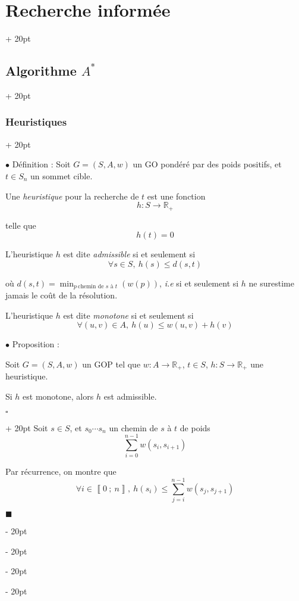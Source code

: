 \documentclass[a4paper, 12pt, twoside]{article}
\newcommand{\R}{\mathbb{R}} %
\newcommand{\nset}[2]{\left\llbracket #1\ ;\ #2 \right\rrbracket}
\renewcommand{\le}{\leqslant}
\newcommand{\ind}[1][20pt]{\advance\leftskip + #1}
\newcommand{\deind}[1][20pt]{\advance\leftskip - #1}
\newenvironment{indt}[2][20pt]{#2 \par \ind[#1]}{\par \deind} %
\newenvironment{proof}[1][{}]{\begin{indt}{$\square$ #1}}{$\blacksquare$ \end{indt}}
\begin{document}
\begin{indt}{\section{Recherche informée}}
\begin{indt}{\subsection{Algorithme $A^*$}}
\begin{indt}{\subsubsection{Heuristiques}}
                \vspace{12pt}
                
                $\bullet$ Définition : Soit $G = (S, A, w)$ un GO pondéré par des poids positifs, et $t \in S_n$ un sommet cible.

                Une \emph{heuristique} pour la recherche de $t$ est une fonction
                \[
                    h : S \longrightarrow \R_+
                \]

                telle que
                \[
                    h(t) = 0
                \]

                L'heuristique $h$ est dite \emph{admissible} si et seulement si
                \[
                    \forall s \in S,\
                    h(s) \le d(s, t)
                \]

                où $\displaystyle d(s, t) = \min_{p\ \text{chemin de $s$ à $t$}}(w(p))$, \textit{i.e} si et seulement si $h$ ne surestime jamais le coût de la résolution.

                L'heuristique $h$ est dite \emph{monotone} si et seulement si
                \[
                    \forall (u, v) \in A,\
                    h(u) \le w(u, v) + h(v)
                \]

                \vspace{12pt}
                
                $\bullet$ Proposition :
                \begin{emphBox}
                    Soit $G = (S, A, w)$ un GOP tel que $w : A \longrightarrow \R_+$, $t \in S$, $h : S \longrightarrow \R_+$ une heuristique.

                    Si $h$ est monotone, alors $h$ est admissible.
                \end{emphBox}

                \vspace{6pt}
                
                \begin{proof}
                    Soit $s \in S$, et $s_0 \cdots s_n$ un chemin de $s$ à $t$ de poids
                    \[
                        \sum_{i = 0}^{n - 1} w(s_i, s_{i + 1})
                    \]

                    Par récurrence, on montre que
                    \[
                        \forall i \in \nset 0 n,\
                        h(s_i) \le \sum_{j = i}^{n - 1} w(s_j, s_{j + 1})
                    \]


\end{proof}
\end{indt}
\end{indt}
\end{indt}
\end{document}
